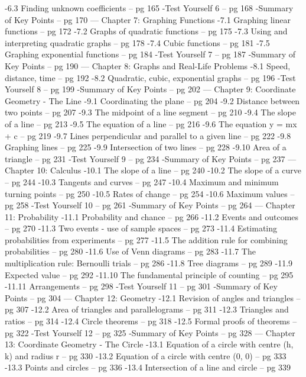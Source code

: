 -6.3 Finding unknown coefficients – pg 165  
-Test Yourself 6 – pg 168  
-Summary of Key Points – pg 170
---
Chapter 7: Graphing Functions  
-7.1 Graphing linear functions – pg 172  
-7.2 Graphs of quadratic functions – pg 175  
-7.3 Using and interpreting quadratic graphs – pg 178  
-7.4 Cubic functions – pg 181  
-7.5 Graphing exponential functions – pg 184  
-Test Yourself 7 – pg 187  
-Summary of Key Points – pg 190
---
Chapter 8: Graphs and Real-Life Problems  
-8.1 Speed, distance, time – pg 192  
-8.2 Quadratic, cubic, exponential graphs – pg 196  
-Test Yourself 8 – pg 199  
-Summary of Key Points – pg 202
---
Chapter 9: Coordinate Geometry - The Line  
-9.1 Coordinating the plane – pg 204  
-9.2 Distance between two points – pg 207  
-9.3 The midpoint of a line segment – pg 210  
-9.4 The slope of a line – pg 213  
-9.5 The equation of a line – pg 216  
-9.6 The equation y = mx + c – pg 219  
-9.7 Lines perpendicular and parallel to a given line – pg 222  
-9.8 Graphing lines – pg 225  
-9.9 Intersection of two lines – pg 228  
-9.10 Area of a triangle – pg 231  
-Test Yourself 9 – pg 234  
-Summary of Key Points – pg 237
---
Chapter 10: Calculus  
-10.1 The slope of a line – pg 240  
-10.2 The slope of a curve – pg 244  
-10.3 Tangents and curves – pg 247  
-10.4 Maximum and minimum turning points – pg 250  
-10.5 Rates of change – pg 254  
-10.6 Maximum values – pg 258  
-Test Yourself 10 – pg 261  
-Summary of Key Points – pg 264
---
Chapter 11: Probability  
-11.1 Probability and chance – pg 266  
-11.2 Events and outcomes – pg 270  
-11.3 Two events - use of sample spaces – pg 273  
-11.4 Estimating probabilities from experiments – pg 277  
-11.5 The addition rule for combining probabilities – pg 280  
-11.6 Use of Venn diagrams – pg 283  
-11.7 The multiplication rule: Bernoulli trials – pg 286  
-11.8 Tree diagrams – pg 289  
-11.9 Expected value – pg 292  
-11.10 The fundamental principle of counting – pg 295  
-11.11 Arrangements – pg 298  
-Test Yourself 11 – pg 301  
-Summary of Key Points – pg 304
---
Chapter 12: Geometry  
-12.1 Revision of angles and triangles – pg 307  
-12.2 Area of triangles and parallelograms – pg 311  
-12.3 Triangles and ratios – pg 314  
-12.4 Circle theorems – pg 318  
-12.5 Formal proofs of theorems – pg 322  
-Test Yourself 12 – pg 325  
-Summary of Key Points – pg 328
---
Chapter 13: Coordinate Geometry - The Circle  
-13.1 Equation of a circle with centre (h, k) and radius r – pg 330  
-13.2 Equation of a circle with centre (0, 0) – pg 333  
-13.3 Points and circles – pg 336  
-13.4 Intersection of a line and circle – pg 339  
